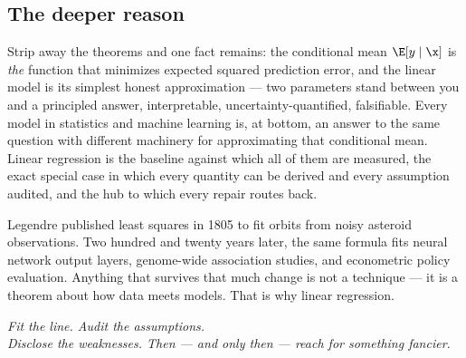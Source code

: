 \subsection{The deeper reason}

Strip away the theorems and one fact remains: the conditional mean $\E[y \mid \x]$ is \emph{the} function that minimizes expected squared prediction error, and the linear model is its simplest honest approximation — two parameters stand between you and a principled answer, interpretable, uncertainty-quantified, falsifiable. Every model in statistics and machine learning is, at bottom, an answer to the same question with different machinery for approximating that conditional mean. Linear regression is the baseline against which all of them are measured, the exact special case in which every quantity can be derived and every assumption audited, and the hub to which every repair routes back.

Legendre published least squares in 1805 to fit orbits from noisy asteroid observations. Two hundred and twenty years later, the same formula fits neural network output layers, genome-wide association studies, and econometric policy evaluation. Anything that survives that much change is not a technique — it is a theorem about how data meets models. That is why linear regression.

\vspace{1.5em}
\begin{center}
\itshape
Fit the line. Audit the assumptions. \\
Disclose the weaknesses. Then — and only then — reach for something fancier.
\end{center}
